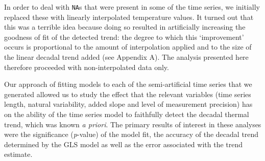 \documentclass[]{ametsoc}
\begin{document}
In order to deal with \texttt{NA}s that were present in some of the time series, we initially replaced these with linearly interpolated temperature values. It turned out that this was a terrible idea because doing so resulted in artificially increasing the goodness of fit of the detected trend: the degree to which this `improvement' occurs is proportional to the amount of interpolation applied and to the size of the linear decadal trend added (see Appendix A). The analysis presented here therefore proceeded with non-interpolated data only.

Our approach of fitting models to each of the semi-artificial time series that we generated allowed us to study the effect that the relevant variables (time series length, natural variability, added slope and level of measurement precision) has on the ability of the time series model to faithfully detect the decadal thermal trend, which was known \emph{a priori}. The primary results of interest in these analyses were the significance (\emph{p}-value) of the model fit, the accuracy of the decadal trend determined by the GLS model as well as the error associated with the trend estimate.
\end{document}
